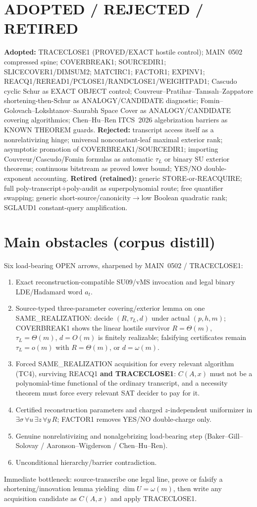 \documentclass[11pt]{article}
\begin{document}
\section*{ADOPTED / REJECTED / RETIRED}
\textbf{Adopted:} TRACECLOSE1 (PROVED/EXACT hostile control); MAIN~0502 compressed spine;
COVERBREAK1; SOURCEDIR1; SLICECOVER1/DIMSUM2; MATCIRC1; FACTOR1; EXPINV1;
REACQ1/REREAD1/PCLOSE1/RANDCLOSE1/WEIGHTPAD1; Cascudo cyclic Schur as EXACT OBJECT control;
Couvreur--Pratihar--Tan{\i}sal{\i}--Zappatore shortening-then-Schur as ANALOGY/CANDIDATE
diagnostic; Fomin--Golovach--Lokshtanov--Saurabh Space Cover as ANALOGY/CANDIDATE covering
algorithmics; Chen--Hu--Ren ITCS~2026 algebrization barriers as KNOWN THEOREM guards.
\textbf{Rejected:} transcript access itself as a nonrelativizing hinge; universal nonconstant-leaf
maximal exterior rank; asymptotic promotion of COVERBREAK1/SOURCEDIR1; importing
Couvreur/Cascudo/Fomin formulas as automatic $\tau_L$ or binary SU exterior theorems;
continuous bitstream as proved lower bound; YES/NO double-exponent accounting.
\textbf{Retired (retained):} generic STORE-or-REACQUIRE; full poly-transcript$+$poly-audit as
superpolynomial route; free quantifier swapping; generic short-source/canonicity$\to$low Boolean
quadratic rank; SGLAUD1 constant-query amplification.

\section*{Main obstacles (corpus distill)}
Six load-bearing OPEN arrows, sharpened by MAIN~0502 / TRACECLOSE1:
\begin{enumerate}
\item Exact reconstruction-compatible SU09/vMS invocation and legal binary LDE/Hadamard word $a_t$.
\item Source-typed three-parameter covering/exterior lemma on one SAME\_REALIZATION: decide
$(R,\tau_L,d)$ under actual $(p,h,m)$; COVERBREAK1 shows the linear hostile survivor
$R=\Theta(m)$, $\tau_L=\Theta(m)$, $d=O(m)$ is finitely realizable; falsifying certificates remain
$\tau_L=o(m)$ with $R=\Theta(m)$, or $d=\omega(m)$.
\item Forced SAME\_REALIZATION acquisition for every relevant algorithm (TC4), surviving REACQ1
\textbf{and TRACECLOSE1}: $C(A,x)$ must not be a polynomial-time functional of the ordinary
transcript, and a necessity theorem must force every relevant SAT decider to pay for it.
\item Certified reconstruction parameters and charged $z$-independent uniformizer in
$\exists\sigma\,\forall u\,\exists z\,\forall y\,R$; FACTOR1 removes YES/NO double-charge only.
\item Genuine nonrelativizing and nonalgebrizing load-bearing step
(Baker--Gill--Solovay / Aaronson--Wigderson / Chen--Hu--Ren).
\item Unconditional hierarchy/barrier contradiction.
\end{enumerate}
Immediate bottleneck: source-transcribe one legal line, prove or falsify a shortening/innovation
lemma yielding $\dim U=\omega(m)$, then write any acquisition candidate as $C(A,x)$ and apply
TRACECLOSE1.
\end{document}
